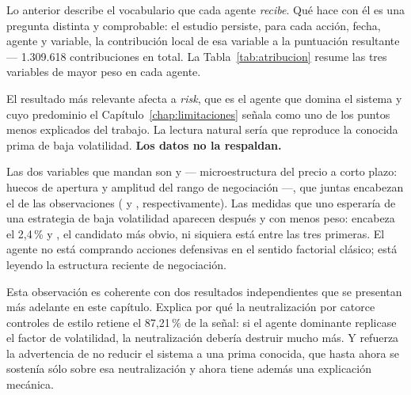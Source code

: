 Lo anterior describe el vocabulario que cada agente \emph{recibe}. Qué hace con él es una pregunta
distinta y comprobable: el estudio persiste, para cada acción, fecha, agente y variable, la
contribución local de esa variable a la puntuación resultante
--- 1.309.618 contribuciones en total. La
Tabla~\ref{tab:atribucion} resume las tres variables de mayor peso en cada agente.

\begin{table}[H]
  \centering
  \small
  \caption{Variables que más contribuyen a la puntuación de cada agente.}
  \label{tab:atribucion}
  
  \caption*{«Contrib. media» es la magnitud media de la contribución local; «Encabeza», la fracción
  de observaciones en las que esa variable fue la primera por importancia. No se reporta el signo
  medio porque se cancela entre acciones y no admite lectura direccional.}
\end{table}

El resultado más relevante afecta a \textit{risk}, que es el agente que domina el sistema y cuyo
predominio el Capítulo~\ref{chap:limitaciones} señala como uno de los puntos menos explicados del
trabajo. La lectura natural sería que reproduce la conocida prima de baja volatilidad. \textbf{Los
datos no la respaldan.}


Las dos variables que mandan son  y  --- microestructura
del precio a corto plazo: huecos de apertura y amplitud del rango de negociación ---, que juntas
encabezan el \DosVariablesRisk{} de las observaciones (\GapShareRisk{} y \RangeShareRisk{},
respectivamente). Las medidas que uno esperaría de una estrategia de baja
volatilidad aparecen después y con menos peso:  encabeza el 2,4\,\% y
, el candidato más obvio, ni siquiera está entre las tres primeras. El agente
no está comprando acciones defensivas en el sentido factorial clásico; está leyendo la estructura
reciente de negociación.

Esta observación es coherente con dos resultados independientes que se presentan más adelante en
este capítulo. Explica por qué la neutralización por catorce controles de estilo
retiene el 87,21\,\% de la señal: si el agente dominante replicase el factor de volatilidad, la
neutralización debería destruir mucho más. Y refuerza la advertencia de no reducir el sistema a una
prima conocida, que hasta ahora se sostenía sólo sobre esa neutralización y ahora tiene además una
explicación mecánica.

